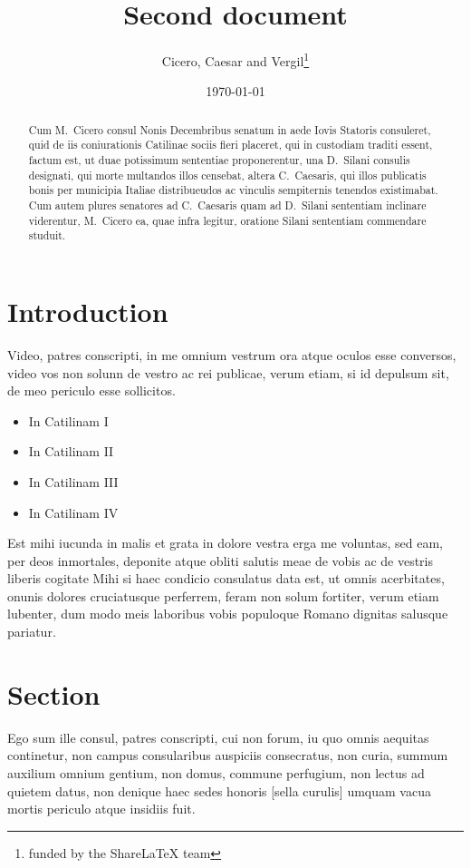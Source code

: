 \documentclass[12pt, a4paper, twoside]{article}
\title{Second document}
\author{Cicero, Caesar and Vergil\thanks{funded by the ShareLaTeX team}}
\date{\today}
\begin{document}
	
	\maketitle
	
	
	\begin{abstract}
		Cum M.~Cicero consul Nonis Decembribus senatum in aede
		Iovis Statoris consuleret, quid de iis coniurationis Catilinae
		sociis fieri placeret, qui in custodiam traditi essent, factum
		est, ut duae potissimum sententiae proponerentur, una D.~Silani consulis
		designati, qui morte multandos illos censebat,
		altera C.~Caesaris, qui illos publicatis bonis per municipia
		Italiae distribueudos ac vinculis sempiternis tenendos existimabat. Cum
		autem plures senatores ad C.~Caesaris quam ad
		D.~Silani sententiam inclinare viderentur, M.~Cicero ea, quae
		infra legitur, oratione Silani sententiam commendare studuit.
		\vfill
	\end{abstract}
	
	\section{Introduction}
	
	Video, patres conscripti, in me omnium vestrum ora atque oculos esse
	conversos, video vos non solunn de vestro ac rei publicae, verum etiam,
	si id depulsum sit, de meo periculo esse sollicitos. 
	\begin{itemize}
		\item In Catilinam I
		\item In Catilinam II
		\item In Catilinam III
		\item In Catilinam IV
	\end{itemize}
Est mihi iucunda in
malis et grata in dolore vestra erga me voluntas, sed eam, per deos
inmortales, deponite atque obliti salutis meae de vobis ac de vestris
liberis cogitate %
Mihi si haec condicio consulatus data est, ut omnis
acerbitates, onunis dolores cruciatusque perferrem, feram non solum
fortiter, verum etiam lubenter, dum modo meis laboribus vobis populoque
Romano dignitas salusque pariatur.

	
	
	\section{Section}
	
	Ego sum ille consul, patres
	conscripti, cui non forum, iu quo omnis aequitas continetur, non campus
	consularibus auspiciis consecratus, non curia, summum auxilium 
	omnium 	gentium, non domus, commune perfugium, non lectus ad quietem datus, non
	denique haec sedes honoris [sella curulis] umquam vacua mortis periculo
	atque insidiis fuit. 
	
\end{document}
